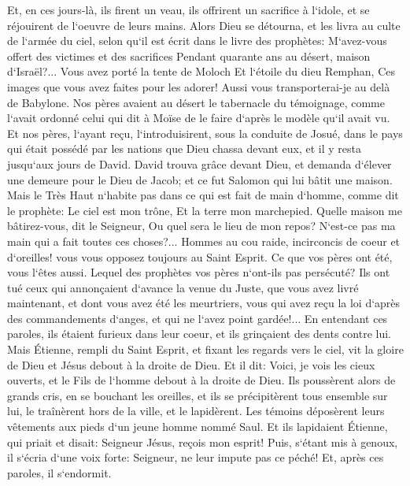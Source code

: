 \verse Et, en ces jours-là, ils firent un veau, ils offrirent un sacrifice à l`idole, et se réjouirent de l`oeuvre de leurs mains. 
\verse Alors Dieu se détourna, et les livra au culte de l`armée du ciel, selon qu`il est écrit dans le livre des prophètes: M`avez-vous offert des victimes et des sacrifices Pendant quarante ans au désert, maison d`Israël?... 
\verse Vous avez porté la tente de Moloch Et l`étoile du dieu Remphan, Ces images que vous avez faites pour les adorer! Aussi vous transporterai-je au delà de Babylone. 
\verse Nos pères avaient au désert le tabernacle du témoignage, comme l`avait ordonné celui qui dit à Moïse de le faire d`après le modèle qu`il avait vu. 
\verse Et nos pères, l`ayant reçu, l`introduisirent, sous la conduite de Josué, dans le pays qui était possédé par les nations que Dieu chassa devant eux, et il y resta jusqu`aux jours de David. 
\verse David trouva grâce devant Dieu, et demanda d`élever une demeure pour le Dieu de Jacob; 
\verse et ce fut Salomon qui lui bâtit une maison. 
\verse Mais le Très Haut n`habite pas dans ce qui est fait de main d`homme, comme dit le prophète: 
\verse Le ciel est mon trône, Et la terre mon marchepied. Quelle maison me bâtirez-vous, dit le Seigneur, Ou quel sera le lieu de mon repos? 
\verse N`est-ce pas ma main qui a fait toutes ces choses?... 
\verse Hommes au cou raide, incirconcis de coeur et d`oreilles! vous vous opposez toujours au Saint Esprit. Ce que vos pères ont été, vous l`êtes aussi. 
\verse Lequel des prophètes vos pères n`ont-ils pas persécuté? Ils ont tué ceux qui annonçaient d`avance la venue du Juste, que vous avez livré maintenant, et dont vous avez été les meurtriers, 
\verse vous qui avez reçu la loi d`après des commandements d`anges, et qui ne l`avez point gardée!... 
\verse En entendant ces paroles, ils étaient furieux dans leur coeur, et ils grinçaient des dents contre lui. 
\verse Mais Étienne, rempli du Saint Esprit, et fixant les regards vers le ciel, vit la gloire de Dieu et Jésus debout à la droite de Dieu. 
\verse Et il dit: Voici, je vois les cieux ouverts, et le Fils de l`homme debout à la droite de Dieu. 
\verse Ils poussèrent alors de grands cris, en se bouchant les oreilles, et ils se précipitèrent tous ensemble sur lui, 
\verse le traînèrent hors de la ville, et le lapidèrent. Les témoins déposèrent leurs vêtements aux pieds d`un jeune homme nommé Saul. 
\verse Et ils lapidaient Étienne, qui priait et disait: Seigneur Jésus, reçois mon esprit! 
\verse Puis, s`étant mis à genoux, il s`écria d`une voix forte: Seigneur, ne leur impute pas ce péché! Et, après ces paroles, il s`endormit. 

